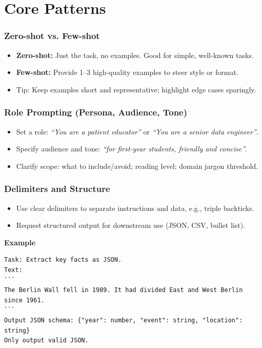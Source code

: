 \documentclass{beamer}
\begin{document}
\section{Core Patterns}

\begin{frame}
	\frametitle{Zero-shot vs. Few-shot}
	\begin{itemize}
		\item \textbf{Zero-shot:} Just the task, no examples. Good for simple, well-known tasks.
		\item \textbf{Few-shot:} Provide 1--3 high-quality examples to steer style or format.
		\item Tip: Keep examples short and representative; highlight edge cases sparingly.
	\end{itemize}
\end{frame}

\begin{frame}
	\frametitle{Role Prompting (Persona, Audience, Tone)}
	\begin{itemize}
		\item Set a role: \textit{``You are a patient educator''} or \textit{``You are a senior data engineer''}.
		\item Specify audience and tone: \textit{``for first-year students, friendly and concise''}.
		\item Clarify scope: what to include/avoid; reading level; domain jargon threshold.
	\end{itemize}
\end{frame}

\begin{frame}[fragile]
	\frametitle{Delimiters and Structure}
	\begin{itemize}
		\item Use clear delimiters to separate instructions and data, e.g., triple backticks.
		\item Request structured output for downstream use (JSON, CSV, bullet list).
	\end{itemize}
\vspace{0.2cm}
\textbf{Example}
\begin{verbatim}
Task: Extract key facts as JSON.
Text:
```
The Berlin Wall fell in 1989. It had divided East and West Berlin since 1961.
```
Output JSON schema: {"year": number, "event": string, "location": string}
Only output valid JSON.
\end{verbatim}
\end{frame}
\end{document}
